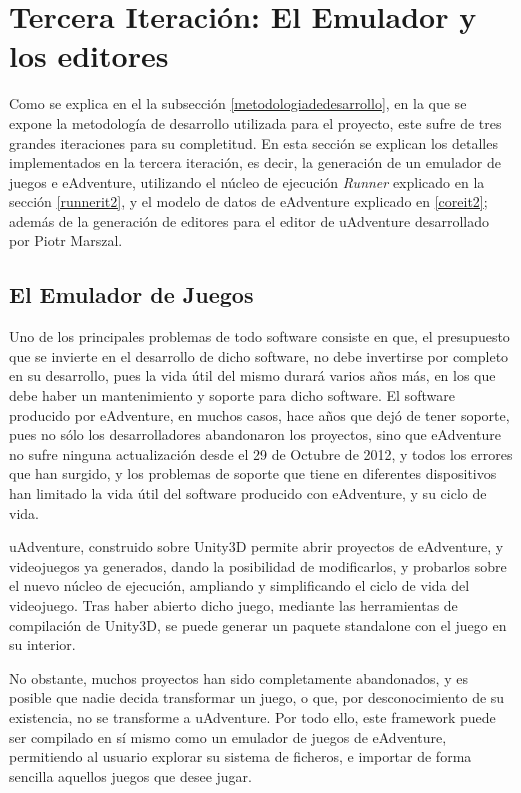 \chapter{Tercera Iteración: El Emulador y los editores}

Como se explica en el la subsección \ref{metodologiadedesarrollo}, en la que se expone la metodología de desarrollo utilizada para el proyecto, este sufre de tres grandes iteraciones para su completitud. En esta sección se explican los detalles implementados en la tercera iteración, es decir, la generación de un emulador de juegos e eAdventure, utilizando el núcleo de ejecución \textit{Runner} explicado en la sección \ref{runnerit2}, y el modelo de datos de eAdventure explicado en \ref{coreit2}; además de la generación de editores para el editor de uAdventure desarrollado por Piotr Marszal. 

\section{El Emulador de Juegos}

Uno de los principales problemas de todo software consiste en que, el presupuesto que se invierte en el desarrollo de dicho software, no debe invertirse por completo en su desarrollo, pues la vida útil del mismo durará varios años más, en los que debe haber un mantenimiento y soporte para dicho software. El software producido por eAdventure, en muchos casos, hace años que dejó de tener soporte, pues no sólo los desarrolladores abandonaron los proyectos, sino que eAdventure no sufre ninguna actualización desde el 29 de Octubre de 2012, y todos los errores que han surgido, y los problemas de soporte que tiene en diferentes dispositivos han limitado la vida útil del software producido con eAdventure, y su ciclo de vida.

uAdventure, construido sobre Unity3D permite abrir proyectos de eAdventure, y videojuegos ya generados, dando la posibilidad de modificarlos, y probarlos sobre el nuevo núcleo de ejecución, ampliando y simplificando el ciclo de vida del videojuego. Tras haber abierto dicho juego, mediante las herramientas de compilación de Unity3D, se puede generar un paquete standalone con el juego en su interior.

No obstante, muchos proyectos han sido completamente abandonados, y es posible que nadie decida transformar un juego, o que, por desconocimiento de su existencia, no se transforme a uAdventure. Por todo ello, este framework puede ser compilado en sí mismo como un emulador de juegos de eAdventure, permitiendo al usuario explorar su sistema de ficheros, e importar de forma sencilla aquellos juegos que desee jugar.

